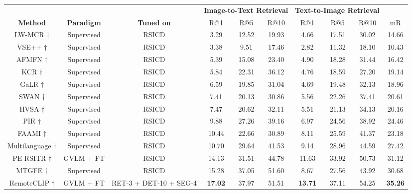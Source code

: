 \documentclass[journal]{IEEEtran}
\begin{document}
\begin{table*}
\label{table:i2t_t2i}
\centering
\footnotesize
\setlength{\tabcolsep}{7pt}
\begin{tabular}{cccccccccc}
\toprule
\multicolumn{3}{c}{} & \multicolumn{3}{c}{\textbf{Image-to-Text Retrieval}} & \multicolumn{3}{c}{\textbf{Text-to-Image Retrieval}} & \multicolumn{1}{c}{} \\
\cmidrule(rl){4-6} \cmidrule(rl){7-9}
\textbf{Method}  & \textbf{Paradigm} & \textbf{Tuned on} & {R@1} & {R@5} & {R@10} & {R@1} & {R@5} & {R@10} & {mR} \\
\midrule
LW-MCR \cite{LW-MCR} $ \dagger $ & Supervised & RSICD&3.29  & 12.52  & 19.93  &  4.66  & 17.51   & 30.02  &  14.66 \\ 
VSE++ \cite{vse++} $ \dagger $ & Supervised & RSICD &  3.38  & 9.51  & 17.46  & 2.82  & 11.32  & 18.10  & 10.43  \\
AFMFN \cite{RSITMD} $ \dagger $& Supervised & RSICD &  5.39  & 15.08  & 23.40  & 4.90  & 18.28  & 31.44  & 16.42  \\
KCR \cite{kcr} $ \dagger $ & Supervised & RSICD &  5.84  & 22.31  & 36.12  & 4.76  & 18.59  & 27.20  & 19.14  \\
GaLR \cite{galr} $ \dagger $ & Supervised & RSICD &  6.59  & 19.85  & 31.04  & 4.69  & 19.48  & 32.13  & 18.96  \\
SWAN $ \dagger $ & Supervised & RSICD & 7.41  & 20.13  & 30.86  & 5.56  & 22.26  & 37.41  & 20.61  \\
HVSA \cite{hvsa} $ \dagger $ & Supervised & RSICD&7.47 &20.62 &32.11 &5.51 &21.13 &34.13 & 20.16  \\ 
PIR \cite{pir} $ \dagger $ & Supervised & RSICD& 9.88   & 27.26   & 39.16  & 6.97   & 24.56   & 38.92  & 24.46 \\ 
FAAMI \cite{Zheng_2023} $ \dagger $ & Supervised & RSICD& 10.44  & 22.66  & 30.89  & 8.11  &  25.59  & 41.37  & 23.18  \\ 
Multilanguage \cite{multilingual} $ \dagger $ &Supervised & RSICD &10.70 & 29.64& 41.53& 9.14&28.96 &44.59 & 27.42\\
PE-RSITR \cite{yuan2023parameterefficient} $ \dagger $ &GVLM + FT& RSICD & 14.13 & 31.51 & 44.78 & 11.63 & 33.92 & 50.73 & 31.12\\
MTGFE \cite{MTGFE} $ \dagger $ &Supervised& RSICD & 15.28& 37.05 & 51.60 & 8.67& 27.56& 43.92 & 30.68\\
RemoteCLIP \cite{liu2023remoteclip} $ \dagger $ & GVLM + FT & RET-3 + DET-10 + SEG-4 & \textbf{17.02} & 37.97& 51.51& \textbf{13.71} & 37.11 & 54.25 & \textbf{35.26} \\

\end{tabular}
\end{table*}
\end{document}
